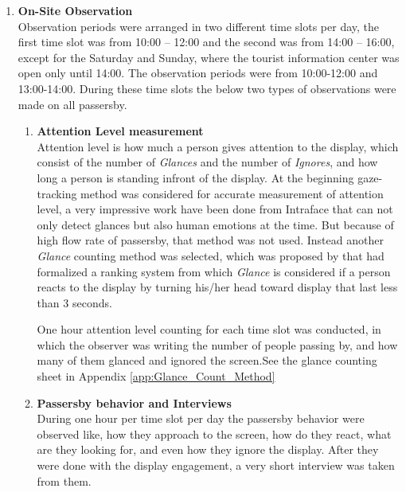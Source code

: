 \begin{enumerate}
\item \textbf{On-Site Observation} \\
Observation periods were arranged in two different time slots per day, the first time slot was from 10:00 – 12:00 and the second was from 14:00 – 16:00, except for the Saturday and Sunday, where the tourist information center was open only until 14:00. The observation periods were from 10:00-12:00 and 13:00-14:00. During these time slots the below two types of observations were made on all passersby.


\begin{enumerate}
\item \textbf{Attention Level measurement} \\
Attention level is how much a person gives attention to the display, which consist of the number of \emph{Glances} and the number of \emph{Ignores}, and how long a person is standing infront of the display. At the beginning gaze-tracking method was considered for accurate measurement of attention level, a very impressive work have been done from Intraface \cite{Intraface} that can not only detect glances but also human emotions at the time. But because of high flow rate of passersby, that method was not used. Instead another \emph{Glance} counting method was selected, which was proposed by \cite{glancingcount} that had formalized a ranking system from which  \emph{Glance} is considered if a person reacts to the display by turning his/her head toward display that last less than 3 seconds.

One hour attention level counting for each time slot was conducted, in which the observer was writing the number of people passing by, and how many of them glanced and ignored the screen.See the glance counting sheet in Appendix \ref{app:Glance_Count_Method}


\item \textbf{Passersby behavior and Interviews} \\
During one hour per time slot per day the passersby behavior were observed like, how they approach to the screen, how do they react, what are they looking for, and even how they ignore the display. After they were done with the display engagement, a very short interview was taken from them. 


\end{enumerate}
\end{enumerate}
